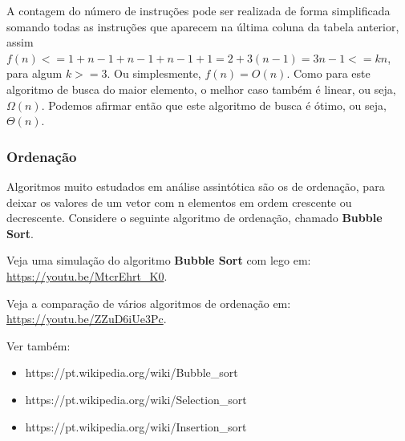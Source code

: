 \documentclass[12pt,a4paper]{article}
\begin{document}
    A contagem do número de instruções pode ser realizada de forma
simplificada somando todas as instruções que aparecem na última coluna
da tabela anterior, assim
\(f(n) <= 1 + n-1 + n-1 + n-1 + 1 = 2 + 3(n-1) = 3n -1 <= kn\), para
algum \(k>=3\). Ou simplesmente, \(f(n) = O(n)\). Como para este
algoritmo de busca do maior elemento, o melhor caso também é linear, ou
seja, \(\Omega(n)\). Podemos afirmar então que este algoritmo de busca é
ótimo, ou seja, \(\Theta(n)\).

    \hypertarget{ordenauxe7uxe3o}{%
\subsubsection{Ordenação}\label{ordenauxe7uxe3o}}

    Algoritmos muito estudados em análise assintótica são os de ordenação,
para deixar os valores de um vetor com n elementos em ordem crescente ou
decrescente. Considere o seguinte algoritmo de ordenação, chamado
\textbf{Bubble Sort}.

Veja uma simulação do algoritmo \textbf{Bubble Sort} com lego em:
\url{https://youtu.be/MtcrEhrt_K0}.

Veja a comparação de vários algoritmos de ordenação em:
\url{https://youtu.be/ZZuD6iUe3Pc}.

Ver também:

\begin{itemize}
\item
  https://pt.wikipedia.org/wiki/Bubble\_sort
\item
  https://pt.wikipedia.org/wiki/Selection\_sort
\item
  https://pt.wikipedia.org/wiki/Insertion\_sort
\end{itemize}
\end{document}
